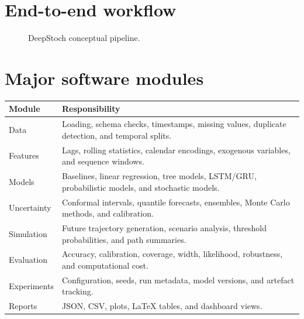\documentclass[11pt,a4paper]{report}
\begin{document}
\section{End-to-end workflow}
\begin{figure}[H]
\centering
{}
\caption{DeepStoch conceptual pipeline.}
\label{fig:pipeline}
\end{figure}

\section{Major software modules}
\begin{longtable}{p{}p{}}
\toprule
\textbf{Module} & \textbf{Responsibility} \\
\midrule
Data & Loading, schema checks, timestamps, missing values, duplicate detection, and temporal splits. \\
Features & Lags, rolling statistics, calendar encodings, exogenous variables, and sequence windows. \\
Models & Baselines, linear regression, tree models, LSTM/GRU, probabilistic models, and stochastic models. \\
Uncertainty & Conformal intervals, quantile forecasts, ensembles, Monte Carlo methods, and calibration. \\
Simulation & Future trajectory generation, scenario analysis, threshold probabilities, and path summaries. \\
Evaluation & Accuracy, calibration, coverage, width, likelihood, robustness, and computational cost. \\
Experiments & Configuration, seeds, run metadata, model versions, and artefact tracking. \\
Reports & JSON, CSV, plots, LaTeX tables, and dashboard views. \\
\bottomrule
\end{longtable}
\end{document}
